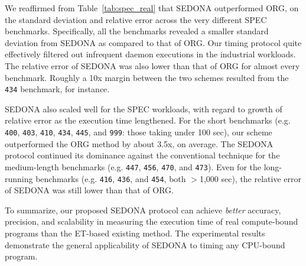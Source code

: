 \documentclass[letter]{ieice}
\begin{document}
{We reaffirmed from Table~\ref{tab:spec_real} that SEDONA outperformed ORG,
on the standard deviation and relative error across the very different SPEC benchmarks.
Specifically, all the benchmarks revealed a smaller standard deviation 
from SEDONA as compared to that of ORG.
Our timing protocol quite effectively filtered out infrequent daemon executions 
in the industrial workloads. The relative error of SEDONA was also 
lower than that of ORG for almost every benchmark.
Roughly a 10x margin between the two schemes resulted from the {\tt 434} benchmark, for instance.
}

SEDONA also scaled well for the SPEC workloads, 
with regard to growth of relative error as the execution time lengthened.
For the short benchmarks 
(e.g. {\tt 400}, {\tt 403}, {\tt 410}, 
{\tt 434}, {\tt 445}, and {\tt 999}: those taking \hbox{under} 100 sec), 
our scheme outperformed the ORG method by about 3.5x, on average. 
The SEDONA protocol continued its dominance against the conventional technique 
for the medium-length benchmarks (e.g. {\tt 447}, {\tt 456}, {\tt 470}, and {\tt 473}).
Even for the long-running benchmarks (e.g. {\tt 416}, {\tt 436}, and {\tt 454}, both $>$1,000 sec), 
the relative error of \hbox{SEDONA} was still lower than that of ORG.

To summarize, our proposed SEDONA protocol can achieve {\em better} accuracy,
precision, and scalability in measuring the execution time of real \hbox{compute-bound} programs 
than the ET-based existing method. 
The experimental results demonstrate 
the general applicability of SEDONA to timing any CPU-bound program.
\end{document}
